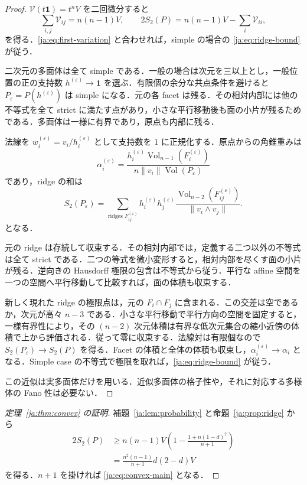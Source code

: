 \documentclass[12pt]{amsart}
\theoremstyle{definition}
\theoremstyle{remark}
\numberwithin{equation}{section}
\theoremstyle{plain}
\theoremstyle{definition}
\theoremstyle{remark}
\begin{document}
\begin{proof}
$\mathcal V(t\mathbf1)=t^nV$ を二回微分すると
\begin{equation}\label{ja:eq:euler-volume}
 \sum_{i,j}\mathcal V_{ij}=n(n-1)V,\qquad
 2S_2(P)=n(n-1)V-\sum_i\mathcal V_{ii},
\end{equation}
を得る．\eqref{ja:eq:first-variation} と合わせれば，simple の場合の \eqref{ja:eq:ridge-bound} が従う．

二次元の多面体は全て simple である．一般の場合は次元を三以上とし，一般位置の正の支持数 $h^{(\varepsilon)}\to\mathbf1$ を選ぶ．有限個の余分な共点条件を避けると $P_\varepsilon=P(h^{(\varepsilon)})$ は simple になる．元の各 facet は残る．その相対内部には他の不等式を全て strict に満たす点があり，小さな平行移動後も面の小片が残るためである．多面体は一様に有界であり，原点も内部に残る．

法線を $w_i^{(\varepsilon)}=v_i/h_i^{(\varepsilon)}$ として支持数を $1$ に正規化する．原点からの角錐重みは
\[
\alpha_i^{(\varepsilon)}
=\frac{h_i^{(\varepsilon)}
\operatorname{Vol}_{n-1}(F_i^{(\varepsilon)})}
{n\|v_i\|\operatorname{Vol}(P_\varepsilon)}
\]
であり，ridge の和は
\begin{equation}\label{ja:eq:perturbed-ridge}
 S_2(P_\varepsilon)=
 \sum_{\text{ridges }F_{ij}^{(\varepsilon)}}
 h_i^{(\varepsilon)}h_j^{(\varepsilon)}
 \frac{\operatorname{Vol}_{n-2}(F_{ij}^{(\varepsilon)})}
 {\|v_i\wedge v_j\|}.
\end{equation}
となる．

元の ridge は存続して収束する．その相対内部では，定義する二つ以外の不等式は全て strict である．二つの等式を微小変形すると，相対内部を尽くす面の小片が残る．逆向きの Hausdorff 極限の包含は不等式から従う．平行な affine 空間を一つの空間へ平行移動して比較すれば，面の体積も収束する．

新しく現れた ridge の極限点は，元の $F_i\cap F_j$ に含まれる．この交差は空であるか，次元が高々 $n-3$ である．小さな平行移動で平行方向の空間を固定すると，一様有界性により，その $(n-2)$ 次元体積は有界な低次元集合の縮小近傍の体積で上から評価される．従って零に収束する．法線対は有限個なので $S_2(P_\varepsilon)\to S_2(P)$ を得る．Facet の体積と全体の体積も収束し，$\alpha_i^{(\varepsilon)}\to\alpha_i$ となる．Simple case の不等式で極限を取れば，\eqref{ja:eq:ridge-bound} が従う．

この近似は実多面体だけを用いる．近似多面体の格子性や，それに対応する多様体の Fano 性は必要ない．
\end{proof}

\begin{proof}[定理~\ref{ja:thm:convex} の証明]
補題~\ref{ja:lem:probability} と命題~\ref{ja:prop:ridge} から
\[
\begin{aligned}
2S_2(P)
&\ge n(n-1)V\left(1-\frac{1+n(1-d)^2}{n+1}\right)\\
&=\frac{n^2(n-1)}{n+1}d(2-d)V
\end{aligned}
\]
を得る．$n+1$ を掛ければ \eqref{ja:eq:convex-main} となる．
\end{proof}
\end{document}
